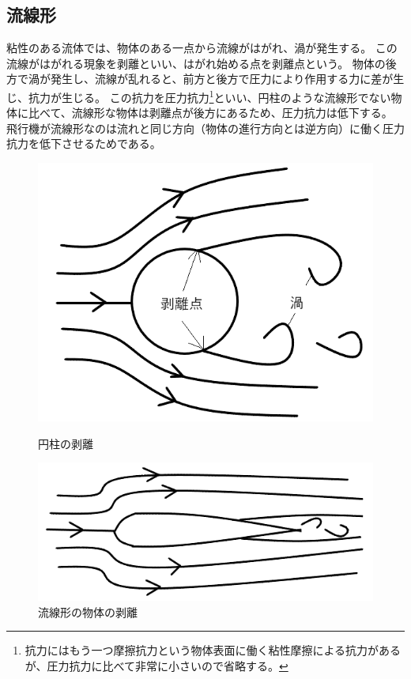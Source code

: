 \documentclass[10pt,b5paper,papersize,dvipdfmx]{jsbook}
\begin{document}
\subsection{流線形}
粘性のある流体では、物体のある一点から流線がはがれ、渦が発生する。
この流線がはがれる現象を剥離といい、はがれ始める点を剥離点という。
物体の後方で渦が発生し、流線が乱れると、前方と後方で圧力により作用する力に差が生じ、抗力が生じる。
この抗力を圧力抗力\footnote{抗力にはもう一つ摩擦抗力という物体表面に働く粘性摩擦による抗力があるが、圧力抗力に比べて非常に小さいので省略する。}といい、円柱のような流線形でない物体に比べて、流線形な物体は剥離点が後方にあるため、圧力抗力は低下する。
飛行機が流線形なのは流れと同じ方向（物体の進行方向とは逆方向）に働く圧力抗力を低下させるためである。
\begin{figure}[ht]
  \captionsetup{margin=0zw} %
  \centering
  \begin{minipage}{0.49\textwidth}
    \includegraphics[width=\textwidth]{img/ryuutai5.png}
    \caption{円柱の剥離}
  \end{minipage}
  \begin{minipage}{0.49\textwidth}
    \includegraphics[width=\textwidth]{img/ryuutai6.png}
    \caption{流線形の物体の剥離}
  \end{minipage}
\end{figure}
\end{document}
